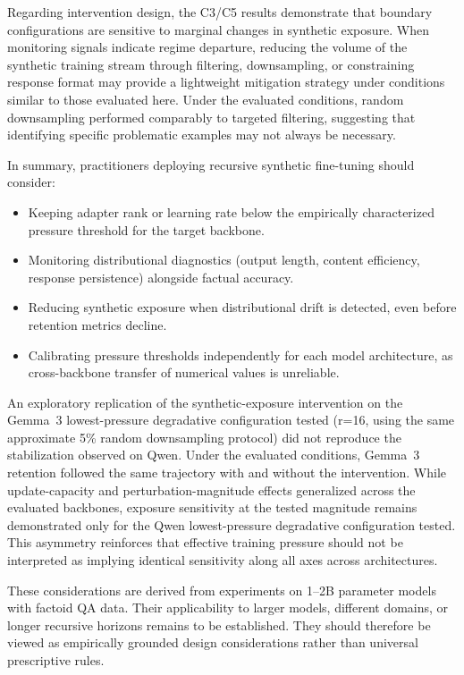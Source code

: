 \documentclass[a4paper,fleqn]{cas-dc}
\newif\ifshowchanges
\newcommand{\rev}[1]{\ifshowchanges{\color{blue}#1}\else{#1}\fi}
\begin{document}
Regarding intervention design, the C3/C5 results demonstrate that boundary
configurations are sensitive to marginal changes in synthetic exposure. When
monitoring signals indicate regime departure, reducing the volume of the
synthetic training stream through filtering, downsampling, or constraining
response format may provide a lightweight mitigation strategy under conditions
similar to those evaluated here. Under the evaluated conditions, random
downsampling performed comparably to targeted filtering, suggesting that
identifying specific problematic examples may not always be necessary.

In summary, practitioners deploying recursive synthetic fine-tuning should
consider:
\begin{itemize}
    \item Keeping adapter rank or learning rate below the empirically
    characterized pressure threshold for the target backbone.
    \item Monitoring distributional diagnostics (output length, content
    efficiency, response persistence) alongside factual accuracy.
    \item Reducing synthetic exposure when distributional drift is detected,
    even before retention metrics decline.
    \item Calibrating pressure thresholds independently for each model
    architecture, as cross-backbone transfer of numerical values is unreliable.
\end{itemize}

An exploratory replication of the synthetic-exposure intervention on the
Gemma~3 \rev{lowest-pressure degradative configuration tested} (r=16, using the same approximate 5\% random
downsampling protocol) did not reproduce the stabilization observed on Qwen.
Under the evaluated conditions, Gemma~3 retention followed the same
trajectory with and without the intervention. While update-capacity and
perturbation-magnitude effects generalized across the evaluated backbones,
exposure sensitivity at the tested magnitude remains demonstrated only for
the Qwen \rev{lowest-pressure degradative configuration tested}. This asymmetry reinforces that effective
training pressure should not be interpreted as implying identical sensitivity
along all axes across architectures.

These considerations are derived from experiments on 1--2B parameter models with
factoid QA data. Their applicability to larger models, different domains, or
longer recursive horizons remains to be established. They should therefore be
viewed as empirically grounded design considerations rather than universal
prescriptive rules.
\end{document}
